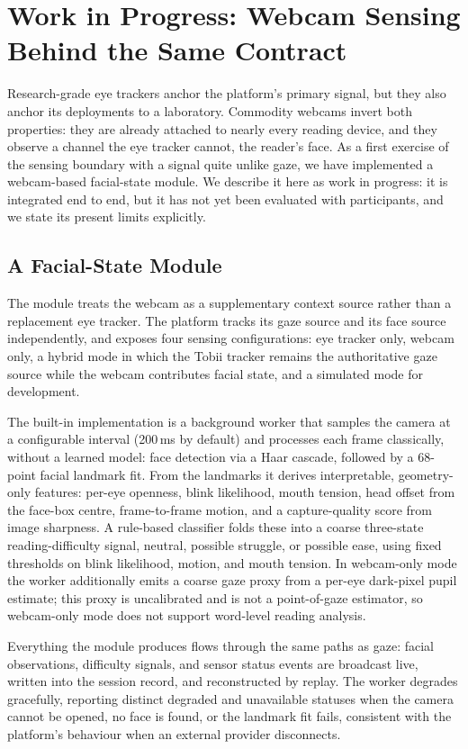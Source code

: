 \section{Work in Progress: Webcam Sensing Behind the Same Contract}
\label{sec:webcam}

Research-grade eye trackers anchor the platform's primary signal, but they also anchor its deployments to a laboratory.
Commodity webcams invert both properties: they are already attached to nearly every reading device, and they observe a channel the eye tracker cannot, the reader's face.
As a first exercise of the sensing boundary with a signal quite unlike gaze, we have implemented a webcam-based facial-state module.
We describe it here as work in progress: it is integrated end to end, but it has not yet been evaluated with participants, and we state its present limits explicitly.

\subsection{A Facial-State Module}

The module treats the webcam as a supplementary context source rather than a replacement eye tracker.
The platform tracks its gaze source and its face source independently, and exposes four sensing configurations: eye tracker only, webcam only, a hybrid mode in which the Tobii tracker remains the authoritative gaze source while the webcam contributes facial state, and a simulated mode for development.

The built-in implementation is a background worker that samples the camera at a configurable interval (200\,ms by default) and processes each frame classically, without a learned model: face detection via a Haar cascade, followed by a 68-point facial landmark fit.
From the landmarks it derives interpretable, geometry-only features: per-eye openness, blink likelihood, mouth tension, head offset from the face-box centre, frame-to-frame motion, and a capture-quality score from image sharpness.
A rule-based classifier folds these into a coarse three-state reading-difficulty signal, neutral, possible struggle, or possible ease, using fixed thresholds on blink likelihood, motion, and mouth tension.
In webcam-only mode the worker additionally emits a coarse gaze proxy from a per-eye dark-pixel pupil estimate; this proxy is uncalibrated and is not a point-of-gaze estimator, so webcam-only mode does not support word-level reading analysis.

Everything the module produces flows through the same paths as gaze: facial observations, difficulty signals, and sensor status events are broadcast live, written into the session record, and reconstructed by replay.
The worker degrades gracefully, reporting distinct degraded and unavailable statuses when the camera cannot be opened, no face is found, or the landmark fit fails, consistent with the platform's behaviour when an external provider disconnects.

